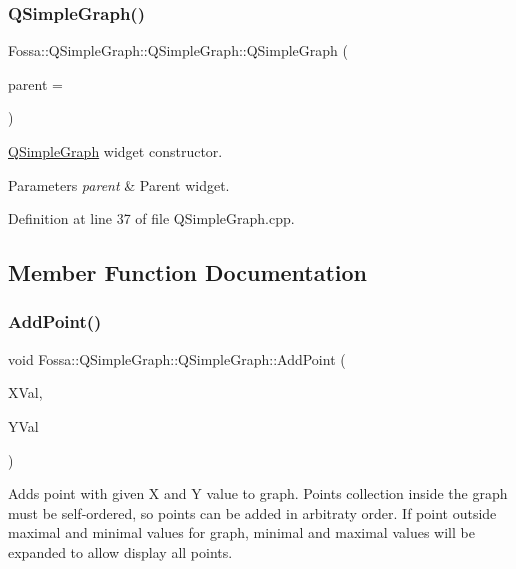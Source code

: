 \subsubsection{\texorpdfstring{Q\+Simple\+Graph()}{QSimpleGraph()}}
{\footnotesize\ttfamily Fossa\+::\+Q\+Simple\+Graph\+::\+Q\+Simple\+Graph\+::\+Q\+Simple\+Graph (\begin{DoxyParamCaption}\item[{Q\+Widget $\ast$}]{parent = {} }\end{DoxyParamCaption})}



\hyperlink{class_fossa_1_1_q_simple_graph_1_1_q_simple_graph}{Q\+Simple\+Graph} widget constructor. 


\begin{DoxyParams}{Parameters}
{\em parent} & Parent widget. \\
\hline
\end{DoxyParams}


Definition at line 37 of file Q\+Simple\+Graph.\+cpp.



\subsection{Member Function Documentation}
\mbox{\label{class_fossa_1_1_q_simple_graph_1_1_q_simple_graph_a39fdbd2aa624b7b086b5761308d8d49c}} 
\subsubsection{\texorpdfstring{Add\+Point()}{AddPoint()}}
{\footnotesize\ttfamily void Fossa\+::\+Q\+Simple\+Graph\+::\+Q\+Simple\+Graph\+::\+Add\+Point (\begin{DoxyParamCaption}\item[{double}]{X\+Val,  }\item[{double}]{Y\+Val }\end{DoxyParamCaption})\hspace{0.3cm}{\ttfamily [virtual]}}



Adds point with given X and Y value to graph. Points collection inside the graph must be self-\/ordered, so points can be added in arbitraty order. If point outside maximal and minimal values for graph, minimal and maximal values will be expanded to allow display all points. 


